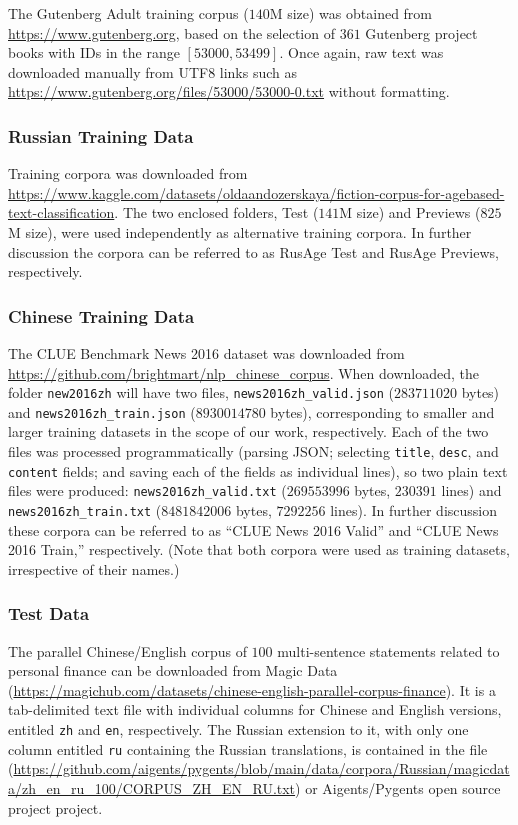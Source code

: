 \documentclass[11pt]{article}
\begin{document}
The Gutenberg Adult training corpus ($140$M size) was obtained from \url{https://www.gutenberg.org}, based on the selection of $361$ Gutenberg project books with IDs in the range $[53000,53499]$. Once again, raw text was downloaded manually from UTF8 links such as \url{https://www.gutenberg.org/files/53000/53000-0.txt} without formatting.

\subsubsection{Russian Training Data}

Training corpora was downloaded from \url{https://www.kaggle.com/datasets/oldaandozerskaya/fiction-corpus-for-agebased-text-classification}. The two enclosed folders, Test ($141$M size) and Previews ($825$M size), were used independently as alternative training corpora. In further discussion the corpora can be referred to as RusAge Test and RusAge Previews, respectively.

\subsubsection{Chinese Training Data}

The CLUE Benchmark News 2016 dataset was downloaded from \url{https://github.com/brightmart/nlp_chinese_corpus}. When downloaded, the folder \texttt{new2016zh} will have two files, \texttt{news2016zh\_valid.json} ($283711020$ bytes) and \texttt{news2016zh\_train.json} ($8930014780$ bytes), corresponding to smaller and larger training datasets in the scope of our work, respectively. Each of the two files was processed programmatically (parsing JSON; selecting \texttt{title}, \texttt{desc}, and \texttt{content} fields; and saving each of the fields as individual lines), so two plain text files were produced: \texttt{news2016zh\_valid.txt} ($269553996$ bytes, $230391$ lines) and \texttt{news2016zh\_train.txt} ($8481842006$ bytes, $7292256$ lines). In further discussion these corpora can be referred to as “CLUE News 2016 Valid” and “CLUE News 2016 Train,” respectively. (Note that both corpora were used as training datasets, irrespective of their names.)

\subsubsection{Test Data}

The parallel Chinese/English corpus of $100$ multi-sentence statements related to personal finance can be downloaded from Magic Data (\url{https://magichub.com/datasets/chinese-english-parallel-corpus-finance}). It is a tab-delimited text file with individual columns for Chinese and English versions, entitled \texttt{zh} and \texttt{en}, respectively. The Russian extension to it, with only one column entitled \texttt{ru} containing the Russian translations, is contained in the file (\url{https://github.com/aigents/pygents/blob/main/data/corpora/Russian/magicdata/zh_en_ru_100/CORPUS_ZH_EN_RU.txt}) or Aigents/Pygents open source project project.
\end{document}
